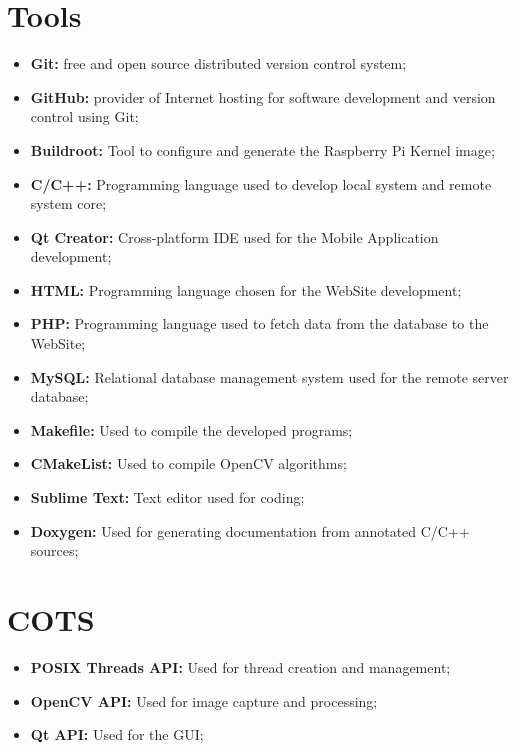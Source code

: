 \clearpage
\section{Tools}

\begin{itemize}
	\item \textbf{Git:} free and open source distributed version control system;
	\item \textbf{GitHub:} provider of Internet hosting for software development and version control using Git;
	\item \textbf{Buildroot:} Tool to configure and generate the Raspberry Pi Kernel image;
	\item \textbf{C/C++:} Programming language used to develop local system and remote system core;
	\item \textbf{Qt Creator:} Cross-platform IDE used for the Mobile Application development;
	\item \textbf{HTML:} Programming language chosen for the WebSite development;
	\item \textbf{PHP:} Programming language used to fetch data from the database to the WebSite;
	\item \textbf{MySQL:} Relational database management system used for the remote server database;
	\item \textbf{Makefile:} Used to compile the developed programs;
	\item \textbf{CMakeList:} Used to compile OpenCV algorithms;
	\item \textbf{Sublime Text:} Text editor used for coding;
	\item \textbf{Doxygen:} Used for generating documentation from annotated C/C++ sources;
\end{itemize}

\section{COTS}

\begin{itemize}
	\item \textbf{POSIX Threads API:} Used for thread creation and management;
	\item \textbf{OpenCV API:} Used for image capture and processing;
	\item \textbf{Qt API:} Used for the GUI;
\end{itemize}

